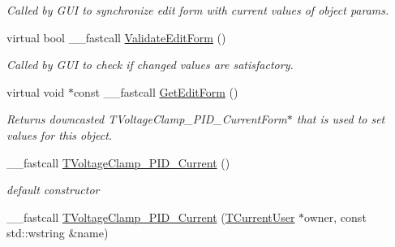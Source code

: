 \begin{DoxyCompactItemize}
\begin{DoxyCompactList}\small\item\em Called by G\+U\+I to synchronize edit form with current values of object params. \end{DoxyCompactList}\item 
\hypertarget{class_t_voltage_clamp___p_i_d___current_a7002ebe60a154e87f930b6836f8c95d7}{virtual bool \+\_\+\+\_\+fastcall \hyperlink{class_t_voltage_clamp___p_i_d___current_a7002ebe60a154e87f930b6836f8c95d7}{Validate\+Edit\+Form} ()}\label{class_t_voltage_clamp___p_i_d___current_a7002ebe60a154e87f930b6836f8c95d7}

\begin{DoxyCompactList}\small\item\em Called by G\+U\+I to check if changed values are satisfactory. \end{DoxyCompactList}\item 
\hypertarget{class_t_voltage_clamp___p_i_d___current_a065e523cb852fbca91bd13e5a93bf293}{virtual void $\ast$const \+\_\+\+\_\+fastcall \hyperlink{class_t_voltage_clamp___p_i_d___current_a065e523cb852fbca91bd13e5a93bf293}{Get\+Edit\+Form} ()}\label{class_t_voltage_clamp___p_i_d___current_a065e523cb852fbca91bd13e5a93bf293}

\begin{DoxyCompactList}\small\item\em Returns downcasted T\+Voltage\+Clamp\+\_\+\+P\+I\+D\+\_\+\+Current\+Form$\ast$ that is used to set values for this object. \end{DoxyCompactList}\item 
\hypertarget{class_t_voltage_clamp___p_i_d___current_a9391484c5bb2a33a3d8972bd6a7b4d3c}{\+\_\+\+\_\+fastcall \hyperlink{class_t_voltage_clamp___p_i_d___current_a9391484c5bb2a33a3d8972bd6a7b4d3c}{T\+Voltage\+Clamp\+\_\+\+P\+I\+D\+\_\+\+Current} ()}\label{class_t_voltage_clamp___p_i_d___current_a9391484c5bb2a33a3d8972bd6a7b4d3c}

\begin{DoxyCompactList}\small\item\em default constructor \end{DoxyCompactList}\item 
\hypertarget{class_t_voltage_clamp___p_i_d___current_a8bedf080162f48cebb5614eb3703c913}{\+\_\+\+\_\+fastcall \hyperlink{class_t_voltage_clamp___p_i_d___current_a8bedf080162f48cebb5614eb3703c913}{T\+Voltage\+Clamp\+\_\+\+P\+I\+D\+\_\+\+Current} (\hyperlink{class_t_current_user}{T\+Current\+User} $\ast$owner, const std\+::wstring \&name)}\label{class_t_voltage_clamp___p_i_d___current_a8bedf080162f48cebb5614eb3703c913}


\end{DoxyCompactItemize}
